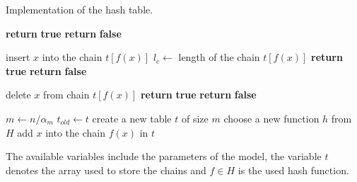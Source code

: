 \begin{algorithm}[ht]
\caption{Implementation of the hash table.}
\label{algorithm-hash-table}
\begin{minipage}[t]{0.5\linewidth}
\begin{algorithmic}
		\State \textbf{return} \textbf{true} 
	\Else
		\State \textbf{return} \textbf{false} 
	\EndIf
\EndProcedure
\end{algorithmic}
\vspace{0.1cm}
\begin{algorithmic}
		\State insert $x$ into the chain $t[f(x)]$
			\State {}
		\Else
			\State $l_c \leftarrow $ length of the chain $t[f(x)]$
				\State {}
			\EndIf
		\EndIf
		\State \textbf{return} \textbf{true} 
	\Else
		\State \textbf{return} \textbf{false} 
	\EndIf
\EndProcedure
\end{algorithmic}
\end{minipage}
\hfill
\begin{minipage}[t]{0.49\linewidth}
\begin{algorithmic}
		\State delete $x$ from chain $t[f(x)]$
			\State {}
		\EndIf
		\State \textbf{return} \textbf{true} 
	\Else
		\State \textbf{return} \textbf{false} 
	\EndIf
\EndProcedure
\end{algorithmic}
\vspace{0.1cm}
\begin{algorithmic}
	\State {}
		\State $m \leftarrow n / \alpha_m$
	\EndIf
	\State $t_{old} \leftarrow t$
	\Repeat
		\State create a new table $t$ of size $m$
		\State choose a new function $h$ from $H$
			\State add $x$ into the chain $f(x)$ in $t$
		\EndFor
\EndProcedure
\end{algorithmic}
\end{minipage}
\begin{minipage}[t]{\linewidth}
\vspace{0.3cm}
The available variables include the parameters of the model, the variable $t$ denotes the array used to store the chains and $f \in H$ is the used hash function.
\end{minipage}
\end{algorithm}